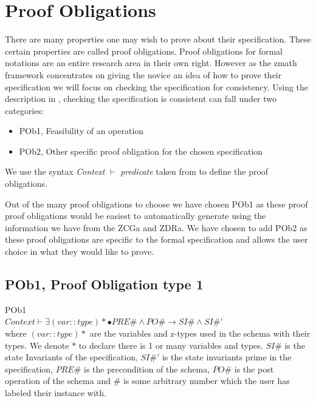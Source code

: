 \section{Proof Obligations}
\label{sec:proofobl}

There are many properties one may wish to prove about their specification. These
certain properties are called proof obligations. Proof obligations for formal
notations are an entire research area in their own right. However as the
\gls{zmath} framework concentrates on giving the novice an idea of how to prove
their specification we will focus on checking the specification for consistency.
Using the description in \cite{DBLP:conf/icsea/WenMZ06}, checking the
specification is consistent can fall under two categories:

\begin{itemize}
\item POb1, Feasibility of an operation
\item POb2, Other specific proof obligation for the chosen specification
\end{itemize}

We use the syntax \textit{Context} $\vdash$ \textit{predicate} taken from
\cite{DBLP:conf/icsea/WenMZ06} to define the proof obligations.

Out of the many proof obligations to choose we have chosen POb1 as these proof
proof obligations would be easiest to automatically generate using the
information we have from the ZCGa and ZDRa. We have chosen to add POb2 as these
proof obligations are specific to the formal specification and allows the user
choice in what they would like to prove.

\subsection{POb1, Proof Obligation type 1}
\label{subsec:pob1}

\begin{defin}\label{defa}POb1\\

$Context \vdash \exists (var::type)* \bullet PRE\# \land PO\# \longrightarrow
SI\# \land SI\#'$\\

\noindent where $(var::type)*$ are the variables and z-types used in the schema
with their types. We denote $*$ to declare there is 1 or many variables and
types. $SI\#$ is the state Invariants of the specification, $SI\#'$ is the state
invariants prime in the specification, $PRE\#$ is the precondition of the
schema, $PO\#$ is the post operation of the schema and $\#$ is some arbitrary
number which the user has labeled their instance with.
\end{defin}

